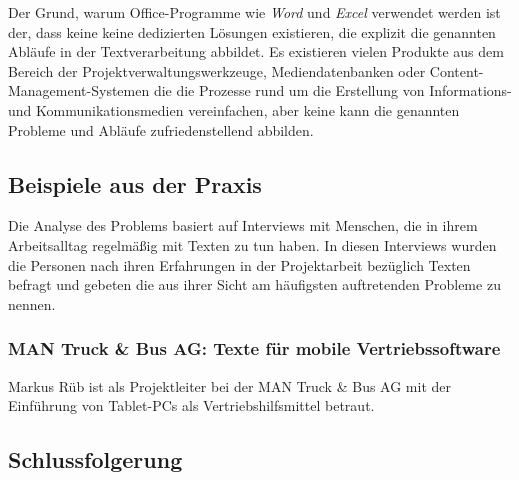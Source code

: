 
Der Grund, warum Office-Programme wie \emph{Word} und \emph{Excel} verwendet werden ist der, dass keine keine dedizierten Lösungen existieren, die explizit die genannten Abläufe in der Textverarbeitung abbildet. Es existieren vielen Produkte aus dem Bereich der Projektverwaltungswerkzeuge, Mediendatenbanken oder Content-Management-Systemen die die Prozesse rund um die Erstellung von Informations- und Kommunikationsmedien vereinfachen, aber keine kann die genannten Probleme und Abläufe zufriedenstellend abbilden.

\subsection{Beispiele aus der Praxis}

Die Analyse des Problems basiert auf Interviews mit Menschen, die in ihrem Arbeitsalltag regelmäßig mit Texten zu tun haben. In diesen Interviews wurden die Personen nach ihren Erfahrungen in der Projektarbeit bezüglich Texten befragt und gebeten die aus ihrer Sicht am häufigsten auftretenden Probleme zu nennen.

\subsubsection{MAN Truck \& Bus AG: Texte für mobile Vertriebssoftware}

Markus Rüb ist als Projektleiter bei der MAN Truck \& Bus AG mit der Einführung von Tablet-PCs als Vertriebshilfsmittel betraut.

\subsection{Schlussfolgerung}

